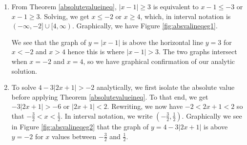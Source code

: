 \medskip

{
\begin{enumerate}

\item  From Theorem \ref{absolutevalueineq}, $|x-1|\geq 3$ is equivalent to $x-1 \leq -3$ or $x-1 \geq 3$. Solving, we get $x \leq -2$ or $x \geq 4$, which, in interval notation is  $(-\infty,-2] \cup [4,\infty)$.  Graphically, we have Figure \ref{fig:absvalineqeg1}.



We see that the graph of $y=|x-1|$  is above the horizontal line $y=3$ for $x < -2$ and $x > 4$ hence this is where $|x-1| > 3$.  The two graphs intersect when $x=-2$ and $x=4$, so we have graphical confirmation of our analytic solution.

\item  To solve $4 - 3|2x+1| > -2$ analytically, we first isolate the absolute value before applying Theorem \ref{absolutevalueineq}.  To that end, we get $-3|2x+1|>-6$ or $|2x+1|<2$.  Rewriting, we now have $-2 < 2x+1 < 2$ so that $-\frac{3}{2} < x < \frac{1}{2}$.  In interval notation, we write $\left(-\frac{3}{2}, \frac{1}{2}\right)$. Graphically we see in Figure \ref{fig:absvalineqeg2} that the graph of $y=4-3|2x+1|$ is above $y=-2$ for $x$ values between $-\frac{3}{2}$ and $\frac{1}{2}$.



\end{enumerate}}
